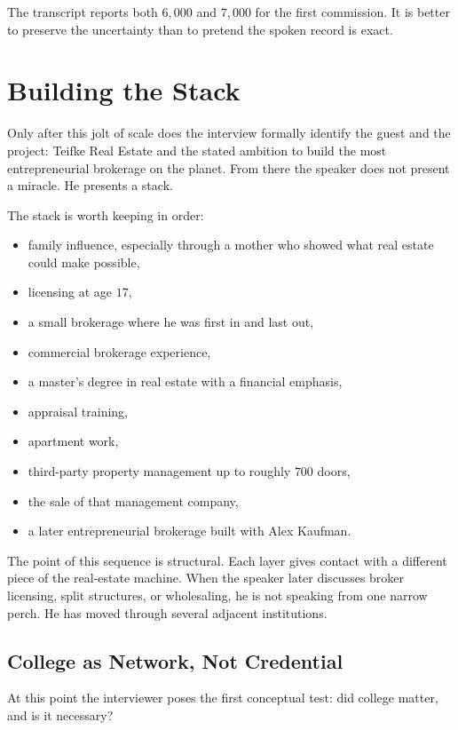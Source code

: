 \begin{remark}
The transcript reports both \(6{,}000\) and \(7{,}000\) for the first commission. It is better to preserve the uncertainty than to pretend the spoken record is exact.
\end{remark}

\section{Building the Stack}

Only after this jolt of scale does the interview formally identify the guest and the project: Teifke Real Estate and the stated ambition to build the most entrepreneurial brokerage on the planet. From there the speaker does not present a miracle. He presents a stack.

The stack is worth keeping in order:
\begin{itemize}
\item family influence, especially through a mother who showed what real estate could make possible,
\item licensing at age \(17\),
\item a small brokerage where he was first in and last out,
\item commercial brokerage experience,
\item a master's degree in real estate with a financial emphasis,
\item appraisal training,
\item apartment work,
\item third-party property management up to roughly \(700\) doors,
\item the sale of that management company,
\item a later entrepreneurial brokerage built with Alex Kaufman.
\end{itemize}

The point of this sequence is structural. Each layer gives contact with a different piece of the real-estate machine. When the speaker later discusses broker licensing, split structures, or wholesaling, he is not speaking from one narrow perch. He has moved through several adjacent institutions.

\subsection{College as Network, Not Credential}

At this point the interviewer poses the first conceptual test: did college matter, and is it necessary?

